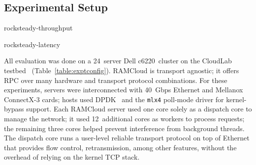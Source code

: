 \subsection{Experimental Setup}
\label{sec:setup}

 {rocksteady-throughput}

 {rocksteady-latency}

All evaluation was done on a 24~server Dell c6220~cluster on the CloudLab
testbed~\cite{cloudlab} (Table~\ref{table:exptconfig}).  RAMCloud is transport
agnostic; it offers RPC over many hardware and transport protocol
combinations.  For these experiments, servers were interconnected with 40~Gbps
Ethernet and Mellanox ConnectX-3 cards; hosts used DPDK~\cite{dpdk} and
the \texttt{mlx4} poll-mode driver for kernel-bypass support.  Each RAMCloud
server used one core solely as a dispatch core to manage the network; it used
12~additional cores as workers to process requests; the remaining
three cores helped prevent interference from background threads. The
dispatch core runs a user-level reliable transport protocol on top of
Ethernet that provides flow control, retransmission, among other
features, without the
overhead of relying on the kernel TCP stack.

%


